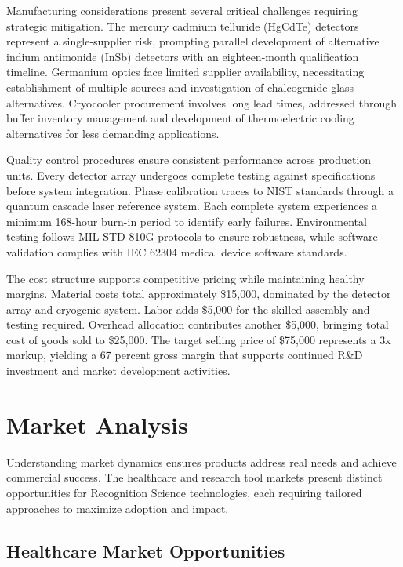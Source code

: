 \documentclass[12pt,a4paper]{report}
\begin{document}
Manufacturing considerations present several critical challenges requiring strategic mitigation. The mercury cadmium telluride (HgCdTe) detectors represent a single-supplier risk, prompting parallel development of alternative indium antimonide (InSb) detectors with an eighteen-month qualification timeline. Germanium optics face limited supplier availability, necessitating establishment of multiple sources and investigation of chalcogenide glass alternatives. Cryocooler procurement involves long lead times, addressed through buffer inventory management and development of thermoelectric cooling alternatives for less demanding applications.

Quality control procedures ensure consistent performance across production units. Every detector array undergoes complete testing against specifications before system integration. Phase calibration traces to NIST standards through a quantum cascade laser reference system. Each complete system experiences a minimum 168-hour burn-in period to identify early failures. Environmental testing follows MIL-STD-810G protocols to ensure robustness, while software validation complies with IEC 62304 medical device software standards.

The cost structure supports competitive pricing while maintaining healthy margins. Material costs total approximately \$15,000, dominated by the detector array and cryogenic system. Labor adds \$5,000 for the skilled assembly and testing required. Overhead allocation contributes another \$5,000, bringing total cost of goods sold to \$25,000. The target selling price of \$75,000 represents a 3x markup, yielding a 67 percent gross margin that supports continued R&D investment and market development activities.

\section{Market Analysis}

Understanding market dynamics ensures products address real needs and achieve commercial success. The healthcare and research tool markets present distinct opportunities for Recognition Science technologies, each requiring tailored approaches to maximize adoption and impact.

\subsection{Healthcare Market Opportunities}
\end{document}
